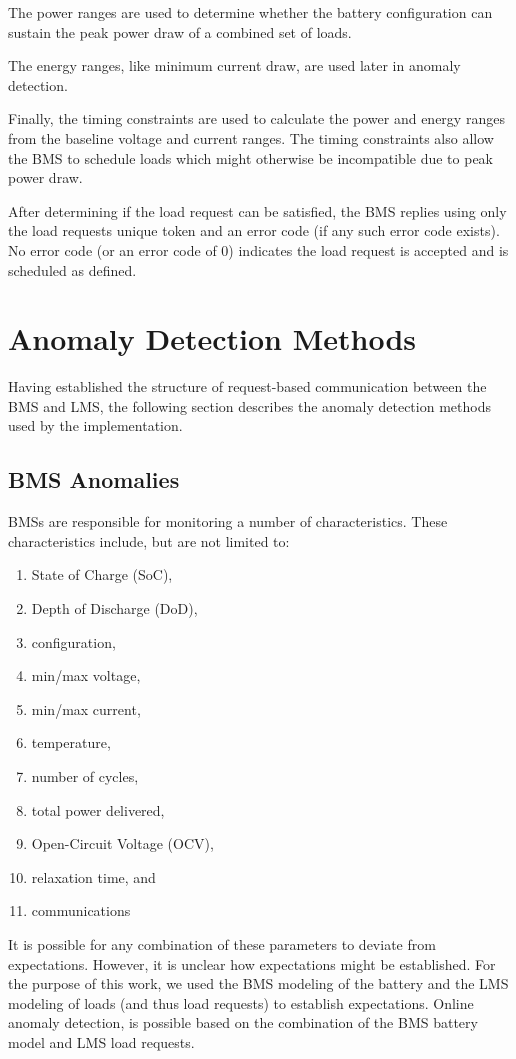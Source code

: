 \documentclass[11pt,conference,draftcls,onecolumn]{IEEEtran}
\begin{document}
The power ranges are used to determine whether the battery configuration can sustain the peak power draw of a combined set of loads.

The energy ranges, like minimum current draw, are used later in anomaly detection.

Finally, the timing constraints are used to calculate the power and energy ranges from the baseline voltage and current ranges.
The timing constraints also allow the BMS to schedule loads which might otherwise be incompatible due to peak power draw.

After determining if the load request can be satisfied, the BMS replies using only the load requests unique token and an error code (if any such error code exists).
No error code (or an error code of 0) indicates the load request is accepted and is scheduled as defined.

\section{Anomaly Detection Methods}\label{sec:anomalyDetection}
Having established the structure of request-based communication between the BMS and LMS, the following section describes the anomaly detection methods used by the implementation.

\subsection{BMS Anomalies}
BMSs are responsible for monitoring a number of characteristics. These characteristics include, but are not limited to:
\begin{enumerate}
    \item State of Charge (SoC),
    \item Depth of Discharge (DoD),
    \item configuration,
    \item min/max voltage,
    \item min/max current,
    \item temperature,
    \item number of cycles,
    \item total power delivered,
    \item Open-Circuit Voltage (OCV),
    \item relaxation time, and
    \item communications
\end{enumerate}

It is possible for any combination of these parameters to deviate from expectations.
However, it is unclear how expectations might be established.
For the purpose of this work, we used the BMS modeling of the battery and the LMS modeling of loads (and thus load requests) to establish expectations.
Online anomaly detection, is possible based on the combination of the BMS battery model and LMS load requests.
\end{document}

